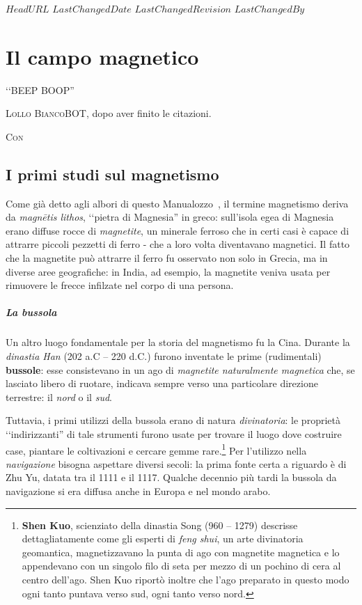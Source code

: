 \svnidlong
{$HeadURL$}
{$LastChangedDate$}
{$LastChangedRevision$}
{$LastChangedBy$}

\chapter{Il campo magnetico}

\begin{introduction}
	‘‘BEEP BOOP''
	\begin{flushright}
		\textsc{Lollo BiancoBOT}, dopo aver finito le citazioni. %
	\end{flushright}
\end{introduction}
\lettrine[findent=1pt, nindent=0pt]{C}{on}

\section{I primi studi sul magnetismo}
Come già detto agli albori di questo Manualozzo\texttrademark\ , il termine magnetismo deriva da \textit{magnētis lithos}, ‘‘pietra di Magnesia'' in greco: sull'isola egea di Magnesia erano diffuse rocce di \textit{magnetite}, un minerale ferroso che in certi casi è capace di attrarre piccoli pezzetti di ferro - che a loro volta diventavano magnetici.
Il fatto che la magnetite può attrarre il ferro fu osservato non solo in Grecia, ma in diverse aree geografiche: in India, ad esempio, la magnetite veniva usata per rimuovere le frecce infilzate nel corpo di una persona.
\paragraph{La bussola}
Un altro luogo fondamentale per la storia del magnetismo fu la Cina. Durante la \textit{dinastia Han} (202 a.C – 220 d.C.) furono inventate le prime (rudimentali) \textbf{bussole}: esse consistevano in un ago di \textit{magnetite naturalmente magnetica} che, se lasciato libero di ruotare, indicava sempre verso una particolare direzione terrestre: il \textit{nord} o il \textit{sud}.

Tuttavia, i primi utilizzi della bussola erano di natura \textit{divinatoria}: le proprietà ‘‘indirizzanti'' di tale strumenti furono usate per trovare il luogo dove costruire case, piantare le coltivazioni e cercare gemme rare.\footnote{\textbf{Shen Kuo}, scienziato della dinastia Song (960 – 1279) descrisse dettagliatamente come gli esperti di \textit{feng shui}, un arte divinatoria geomantica, magnetizzavano la punta di ago con magnetite magnetica e lo appendevano con un singolo filo di seta per mezzo di un pochino di cera al centro dell'ago. Shen Kuo riportò inoltre che l'ago preparato in questo modo ogni tanto puntava verso sud, ogni tanto verso nord.} Per l'utilizzo nella \textit{navigazione} bisogna aspettare diversi secoli: la prima fonte certa a riguardo è di Zhu Yu, datata tra il 1111 e il 1117. Qualche decennio più tardi la bussola da navigazione si era diffusa anche in Europa e nel mondo arabo.

